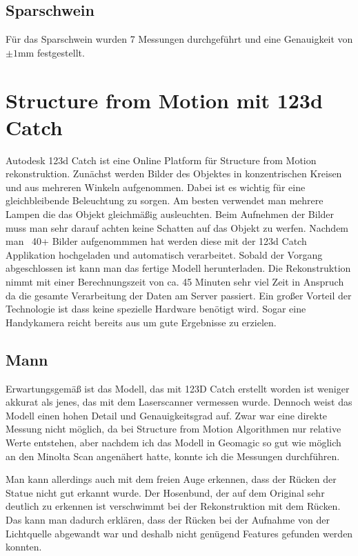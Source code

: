 \documentclass[]{article}
\begin{document}
\subsection{Sparschwein}
Für das Sparschwein wurden 7 Messungen durchgeführt und eine Genauigkeit von $\pm 1$mm festgestellt.

\section{Structure from Motion mit 123d Catch} %

Autodesk 123d Catch ist eine Online Platform für Structure from Motion rekonstruktion. Zunächst werden Bilder des Objektes in konzentrischen Kreisen und aus mehreren Winkeln aufgenommen. Dabei ist es wichtig für eine gleichbleibende Beleuchtung zu sorgen. Am besten verwendet man mehrere Lampen die das Objekt gleichmäßig ausleuchten. Beim Aufnehmen der Bilder muss man sehr darauf achten keine Schatten auf das Objekt zu werfen. Nachdem man ~40+ Bilder aufgenommmen hat werden diese mit der 123d Catch Applikation hochgeladen und automatisch verarbeitet. Sobald der Vorgang abgeschlossen ist kann man das fertige Modell herunterladen. Die Rekonstruktion nimmt mit einer Berechnungszeit von ca. 45 Minuten sehr viel Zeit in Anspruch da die gesamte Verarbeitung der Daten am Server passiert. Ein großer Vorteil der Technologie ist dass keine spezielle Hardware benötigt wird. Sogar eine Handykamera reicht bereits aus um gute Ergebnisse zu erzielen.

\subsection{}
\subsection{Mann}
Erwartungsgemäß ist das Modell, das mit 123D Catch erstellt worden ist weniger akkurat als jenes, das mit dem Laserscanner vermessen wurde. Dennoch weist das Modell einen hohen Detail und Genauigkeitsgrad auf. Zwar war eine direkte Messung nicht möglich, da bei Structure from Motion Algorithmen nur relative Werte entstehen, aber nachdem ich das Modell in Geomagic so gut wie möglich an den Minolta Scan angenähert hatte, konnte ich die Messungen durchführen.

Man kann allerdings auch mit dem freien Auge erkennen, dass der Rücken der Statue nicht gut erkannt wurde. Der Hosenbund, der auf dem Original sehr deutlich zu erkennen ist verschwimmt bei der Rekonstruktion mit dem Rücken. Das kann man dadurch erklären, dass der Rücken bei der Aufnahme von der Lichtquelle abgewandt war und deshalb nicht genügend Features gefunden werden konnten.
\end{document}

